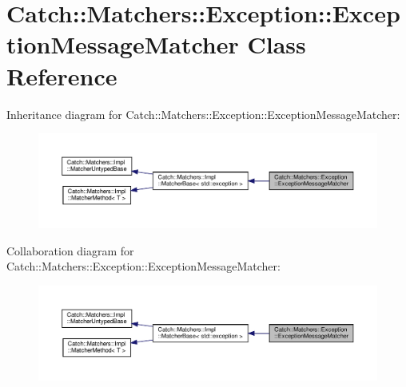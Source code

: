 \hypertarget{classCatch_1_1Matchers_1_1Exception_1_1ExceptionMessageMatcher}{}\section{Catch\+:\+:Matchers\+:\+:Exception\+:\+:Exception\+Message\+Matcher Class Reference}
\label{classCatch_1_1Matchers_1_1Exception_1_1ExceptionMessageMatcher}


Inheritance diagram for Catch\+:\+:Matchers\+:\+:Exception\+:\+:Exception\+Message\+Matcher\+:
\nopagebreak
\begin{figure}[H]
\begin{center}
\leavevmode
\includegraphics[width=350pt]{classCatch_1_1Matchers_1_1Exception_1_1ExceptionMessageMatcher__inherit__graph}
\end{center}
\end{figure}


Collaboration diagram for Catch\+:\+:Matchers\+:\+:Exception\+:\+:Exception\+Message\+Matcher\+:
\nopagebreak
\begin{figure}[H]
\begin{center}
\leavevmode
\includegraphics[width=350pt]{classCatch_1_1Matchers_1_1Exception_1_1ExceptionMessageMatcher__coll__graph}
\end{center}
\end{figure}
